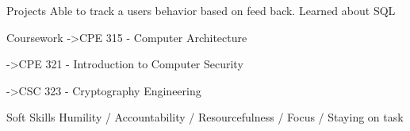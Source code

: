 \documentclass{resume4}%
\begin{document}
\begin{flushleft}
\begin{rSection}{Projects}
\linebreak%
\linebreak%
%
\linebreak%
Able to track a users behavior based on feed back. Learned about SQL%
\end{rSection}%
\begin{rSection}{Coursework}%
\text->{CPE 315 {-} Computer Architecture}%
\item->{CPE 321 {-} Introduction to Computer Security}%
\item->{CSC 323 {-} Cryptography Engineering}%
\end{rSection}%
\begin{rSection}{Soft Skills}%
Humility / Accountability / Resourcefulness / Focus / Staying on task%
\end{rSection}%
\end{flushleft}%
\end{document}
